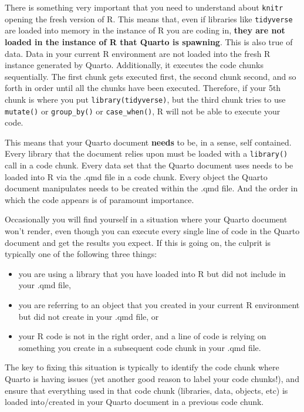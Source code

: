 \documentclass[
  letterpaper,
]{book}
\begin{document}
There is something very important that you need to understand about
\texttt{knitr} opening the fresh version of R. This means that, even if
libraries like \texttt{tidyverse} are loaded into memory in the instance
of R you are coding in, \textbf{they are not loaded in the instance of R
that Quarto is spawning}. This is also true of data. Data in your
current R environment are not loaded into the fresh R instance generated
by Quarto. Additionally, it executes the code chunks sequentially. The
first chunk gets executed first, the second chunk second, and so forth
in order until all the chunks have been executed. Therefore, if your 5th
chunk is where you put \texttt{library(tidyverse)}, but the third chunk
tries to use \texttt{mutate()} or \texttt{group\_by()} or
\texttt{case\_when()}, R will not be able to execute your code.

This means that your Quarto document \textbf{needs} to be, in a sense,
self contained. Every library that the document relies upon must be
loaded with a \texttt{library()} call in a code chunk. Every data set
that the Quarto document uses needs to be loaded into R via the .qmd
file in a code chunk. Every object the Quarto document manipulates needs
to be created within the .qmd file. And the order in which the code
appears is of paramount importance.

\begin{tcolorbox}[enhanced jigsaw, colframe=quarto-callout-tip-color-frame, breakable, arc=.35mm, bottomtitle=1mm, bottomrule=.15mm, colbacktitle=quarto-callout-tip-color!10!white, rightrule=.15mm, colback=white, opacityback=0, opacitybacktitle=0.6, coltitle=black, left=2mm, toptitle=1mm, toprule=.15mm, titlerule=0mm, leftrule=.75mm, title=\textcolor{quarto-callout-tip-color}{\faLightbulb}\hspace{0.5em}{Tip from the Helpdesk: Load Required Libraries Early!}]

Occasionally you will find yourself in a situation where your Quarto
document won't render, even though you can execute every single line of
code in the Quarto document and get the results you expect. If this is
going on, the culprit is typically one of the following three things:

\begin{itemize}
\item
  you are using a library that you have loaded into R but did not
  include in your .qmd file,
\item
  you are referring to an object that you created in your current R
  environment but did not create in your .qmd file, or
\item
  your R code is not in the right order, and a line of code is relying
  on something you create in a subsequent code chunk in your .qmd file.
\end{itemize}

The key to fixing this situation is typically to identify the code chunk
where Quarto is having issues (yet another good reason to label your
code chunks!), and ensure that everything used in that code chunk
(libraries, data, objects, etc) is loaded into/created in your Quarto
document in a previous code chunk.

\end{tcolorbox}
\end{document}
